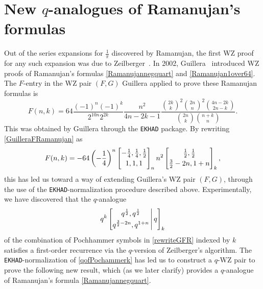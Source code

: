 \documentclass[12pt]{article}
\begin{document}
\section{New $q$-analogues of Ramanujan's formulas}\label{sectionqRamanujan}
 Out of the series expansions for $\frac{1}{\pi}$ discovered by Ramanujan, the first WZ proof for any such expansion was due to 
 Zeilberger~\cite{EkhadZeilberger1994}. In 2002, Guillera~\cite{Guillera2002} introduced WZ proofs of Ramanujan's formulas 
 \eqref{Ramanujannegquart} and \eqref{Ramanujan1over64}. 
 The $F$-entry in the WZ pair $(F, G)$ Guillera applied to prove these Ramanujan formulas is 
\begin{equation}\label{GuilleraFRamanujan}
 F(n, k) = 64 \frac{ (-1)^{n} (-1)^k }{ 2^{10n} 2^{2k} } 
 \frac{n^2}{4n-2k-1} \frac{ \binom{2k}{k}^2 \binom{2n}{n}^2 \binom{4n-2k}{2n-k} }{ \binom{2n}{k} \binom{n+k}{n} }. 
\end{equation}
 This was obtained by Guillera through the {\tt EKHAD} package. By rewriting \eqref{GuilleraFRamanujan} as 
\begin{equation}\label{rewriteGFR}
 F(n, k) = -64 \left( -\frac{1}4{} \right)^{n} \left[ \begin{matrix} 
 -\frac{1}{4}, \frac{1}{4}, \frac{1}{2} \vspace{1mm} \\ 
 1, 1, 1 \end{matrix} \right]_{n} 
 n^2 \left[ \begin{matrix} 
 \frac{1}{2}, \frac{1}{2} \vspace{1mm} \\ 
 \frac{3}{2} - 2 n, 1 + n \end{matrix} \right]_{k}, 
\end{equation}
 this has led us toward a way of extending Guillera's 
 WZ pair $(F, G)$, through the use of the {\tt EKHAD}-normalization procedure described above. 
 Experimentally, we have discovered that the $q$-analogue 
\begin{equation}\label{qofPochammerk}
 q^{k} \left[ \begin{matrix} q^{\frac{1}{2}}, q^{\frac{1}{2}} \vspace{1mm} \\ 
 q^{\frac{3}{2} - 2 n}, q^{1+n} \end{matrix} \, \Bigg| \, q \right]_{k} 
\end{equation}
 of the combination of Pochhammer symbols in \eqref{rewriteGFR}
 indexed by $k$ 
 satisfies a first-order recurrence via the $q$-version of Zeilberger's algorithm. 
 The {\tt EKHAD}-normalization of \eqref{qofPochammerk} 
 has led us to construct a $q$-WZ pair 
 to prove the following new result, 
 which (as we later clarify) 
 provides a $q$-analogue of Ramanujan's formula \eqref{Ramanujannegquart}. 
\end{document}
